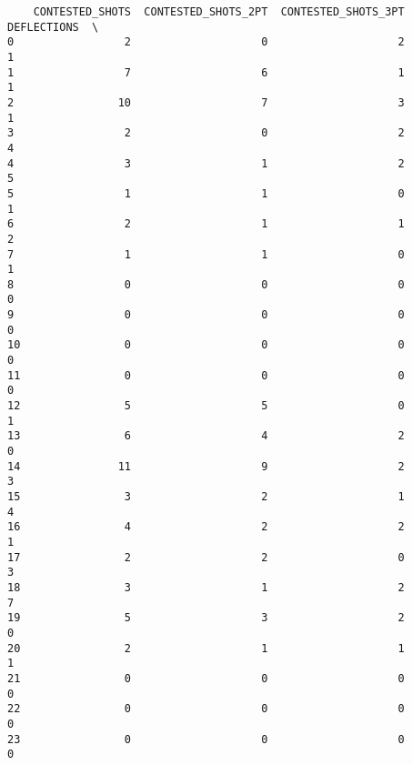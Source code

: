 \begin{verbatim}
    CONTESTED_SHOTS  CONTESTED_SHOTS_2PT  CONTESTED_SHOTS_3PT  DEFLECTIONS  \
0                 2                    0                    2            1   
1                 7                    6                    1            1   
2                10                    7                    3            1   
3                 2                    0                    2            4   
4                 3                    1                    2            5   
5                 1                    1                    0            1   
6                 2                    1                    1            2   
7                 1                    1                    0            1   
8                 0                    0                    0            0   
9                 0                    0                    0            0   
10                0                    0                    0            0   
11                0                    0                    0            0   
12                5                    5                    0            1   
13                6                    4                    2            0   
14               11                    9                    2            3   
15                3                    2                    1            4   
16                4                    2                    2            1   
17                2                    2                    0            3   
18                3                    1                    2            7   
19                5                    3                    2            0   
20                2                    1                    1            1   
21                0                    0                    0            0   
22                0                    0                    0            0   
23                0                    0                    0            0   


\end{verbatim}
